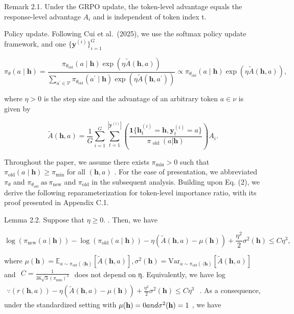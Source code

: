 \documentclass[
  10
]{article}
\begin{document}
Remark 2.1. Under the GRPO update, the token-level advantage equals the
response-level advantage \(A _ { i }\) and is independent of token index
t.

Policy update. Following Cui et al.~(2025), we use the softmax policy
update framework, and one
\(\{ \mathbf { y } ^ { ( i ) } \} _ { i = 1 } ^ { G }\)

\[
\pi_ {\theta} (a \mid \mathbf {h}) = \frac {\pi_ {\theta_ {\text {old}}} (a \mid \mathbf {h}) \exp (\eta \tilde {A} (\mathbf {h} , a))}{\sum_ {a ^ {\prime} \in \mathcal {V}} \pi_ {\theta_ {\text {old}}} (a ^ {\prime} \mid \mathbf {h}) \exp (\eta \tilde {A} (\mathbf {h} , a ^ {\prime}))} \propto \pi_ {\theta_ {\text {old}}} (a \mid \mathbf {h}) \exp (\eta \tilde {A} (\mathbf {h}, a)), \tag {2}
\]

where \(\eta > 0\) is the step size and the advantage of an arbitrary
token \(a \in \nu\) is given by

\[
\tilde {A} (\mathbf {h}, a) = \frac {1}{G} \sum_ {i = 1} ^ {G} \sum_ {t = 1} ^ {| \mathbf {y} ^ {(i)} |} \left(\frac {\mathbf {1} \{\mathbf {h} _ {t} ^ {(i)} = \mathbf {h} , \mathbf {y} _ {t} ^ {(i)} = a \}}{\pi_ {\text { old }} (a | \mathbf {h})}\right) A _ {i}. \tag {3}
\]

Throughout the paper, we assume there exists
\(\pi _ { \operatorname* { m i n } } > 0\) such that
\(\pi _ { \mathrm { o l d } } ( a \mid \mathbf { h } ) \geq \pi _ { \mathrm { m i n } }\)
for all \(( \mathbf { h } , a )\) . For the ease of presentation, we
abbreviated \(\pi _ { \theta }\) and
\(\pi _ { \theta _ { \mathrm { o l d } } } ~ \mathrm { a s } ~ \pi _ { \mathrm { n e w } }\)
and \(\pi _ { \mathrm { o l d } }\) in the subsequent analysis. Building
upon Eq. (2), we derive the following reparameterization for token-level
importance ratio, with its proof presented in Appendix C.1.

Lemma 2.2. Suppose that \(\eta \geq 0 .\) . Then, we have

\[
\log (\pi_ {\mathrm{new}} (a \mid \mathbf {h})) - \log (\pi_ {\mathrm{old}} (a \mid \mathbf {h})) - \eta (\tilde {A} (\mathbf {h}, a) - \mu (\mathbf {h})) + \frac {\eta^ {2}}{2} \sigma^ {2} (\mathbf {h}) \leq C \eta^ {3},
\]

where
\(\mu ( \mathbf { h } ) = \mathbb { E } _ { a \sim \pi _ { \mathrm { o l d } } ( \cdot | \mathbf { h } ) } [ \tilde { A } ( \mathbf { h } , a ) ] , \sigma ^ { 2 } ( \mathbf { h } ) = \mathrm { V a r } _ { a \sim \pi _ { \mathrm { o l d } } ( \cdot | \mathbf { h } ) } [ \tilde { A } ( \mathbf { h } , a ) ]\)
and
\(\begin{array} { r } { C = \frac { 1 } { 3 6 \sqrt { 3 } ( \pi _ { \mathrm { m i n } } ) ^ { 3 } } } \end{array}\)
does not depend on η. Equivalently, we have log
\(\begin{array} { r } { \because ( r ( \mathbf { h } , a ) ) - \eta ( \tilde { A } ( \mathbf { h } , a ) - \mu ( \mathbf { h } ) ) + \frac { \eta ^ { 2 } } { 2 } \sigma ^ { 2 } ( \mathbf { h } ) \leq C \eta ^ { 3 } } \end{array}\)
. As a consequence, under the standardized setting with
\(\mu ( { \bf h } ) = 0 a n d \sigma ^ { 2 } ( { \bf h } ) = 1\) , we
have
\end{document}
